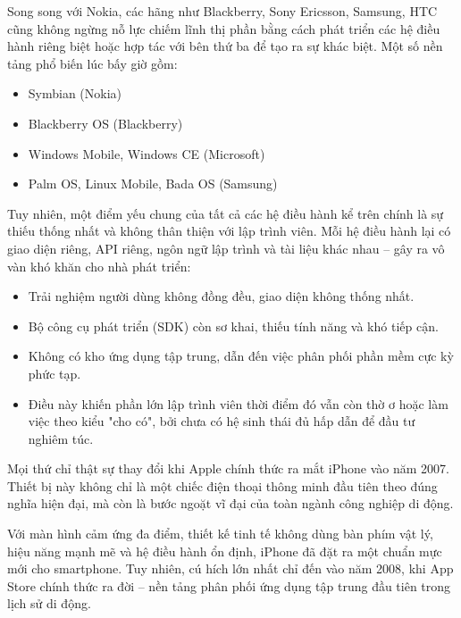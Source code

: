   \begin{flushleft}
  \hspace*{0.8cm}Song song với Nokia, các hãng như Blackberry, Sony Ericsson, Samsung, HTC cũng không ngừng nỗ lực chiếm lĩnh thị phần bằng cách phát triển các hệ điều hành riêng biệt hoặc hợp tác với bên thứ ba để tạo ra sự khác biệt. Một số nền tảng phổ biến lúc bấy giờ gồm:
  \begin{itemize}
  \item Symbian (Nokia)
  \item Blackberry OS (Blackberry)
  \item Windows Mobile, Windows CE (Microsoft)
  \item Palm OS, Linux Mobile, Bada OS (Samsung)
  \end{itemize}
  \end{flushleft}
  
  \begin{flushleft}
  \hspace*{0.8cm}Tuy nhiên, một điểm yếu chung của tất cả các hệ điều hành kể trên chính là sự thiếu thống nhất và không thân thiện với lập trình viên. Mỗi hệ điều hành lại có giao diện riêng, API riêng, ngôn ngữ lập trình và tài liệu khác nhau – gây ra vô vàn khó khăn cho nhà phát triển:
  \begin{itemize}
  \item Trải nghiệm người dùng không đồng đều, giao diện không thống nhất.
  \item Bộ công cụ phát triển (SDK) còn sơ khai, thiếu tính năng và khó tiếp cận.
  \item Không có kho ứng dụng tập trung, dẫn đến việc phân phối phần mềm cực kỳ phức tạp.
  \item[]Điều này khiến phần lớn lập trình viên thời điểm đó vẫn còn thờ ơ hoặc làm việc theo kiểu "cho có", bởi chưa có hệ sinh thái đủ hấp dẫn để đầu tư nghiêm túc.
  \end{itemize}
  \end{flushleft}
  
  \begin{flushleft}
  \hspace*{0.8cm}Mọi thứ chỉ thật sự thay đổi khi Apple chính thức ra mắt iPhone vào năm 2007. Thiết bị này không chỉ là một chiếc điện thoại thông minh đầu tiên theo đúng nghĩa hiện đại, mà còn là bước ngoặt vĩ đại của toàn ngành công nghiệp di động.
  \end{flushleft}
  
  \begin{flushleft}
  \hspace*{0.8cm}Với màn hình cảm ứng đa điểm, thiết kế tinh tế không dùng bàn phím vật lý, hiệu năng mạnh mẽ và hệ điều hành ổn định, iPhone đã đặt ra một chuẩn mực mới cho smartphone. Tuy nhiên, cú hích lớn nhất chỉ đến vào năm 2008, khi App Store chính thức ra đời – nền tảng phân phối ứng dụng tập trung đầu tiên trong lịch sử di động.
  \end{flushleft}
  

